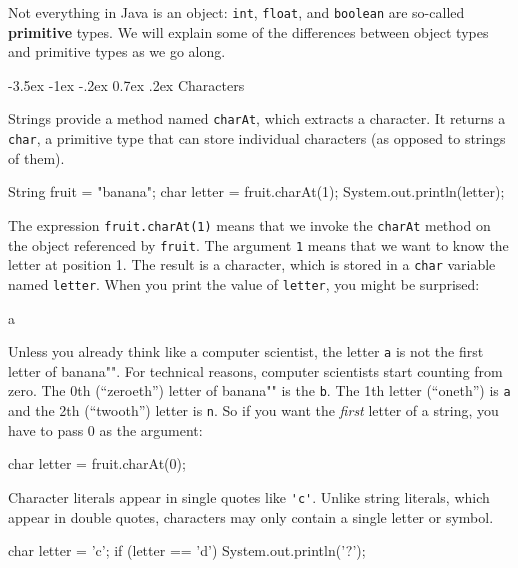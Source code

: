 \documentclass[12pt]{book}
\makeatletter
\theoremstyle{exercise}
\newcommand{\java}[1]{\verb"#1"}
\renewcommand{\section}{\@startsection{section}{1}{\z@}%
    {-3.5ex \@plus -1ex \@minus -.2ex}%
    {0.7ex \@plus.2ex}%
    {\normalfont\Large\bfseries}}
\newcommand{\java}[1]{\lstinline{#1}} %
\makeatother
\begin{document}
Not everything in Java is an object: \java{int}, \java{float}, and \java{boolean} are so-called {\bf primitive} types.
We will explain some of the differences between object types and primitive types as we go along.


\section{Characters}


Strings provide a method named \java{charAt}, which extracts a character.
It returns a \java{char}, a primitive type that can store individual characters (as opposed to strings of them).

\begin{code}
    String fruit = "banana";
    char letter = fruit.charAt(1);
    System.out.println(letter);
\end{code}

The expression \java{fruit.charAt(1)} means that we invoke the \java{charAt} method on the object referenced by \java{fruit}.
The argument \java{1} means that we want to know the letter at position 1.
The result is a character, which is stored in a \java{char} variable named \java{letter}.
When you print the value of \java{letter}, you might be surprised:

\begin{stdout}
a
\end{stdout}

Unless you already think like a computer scientist, the letter \java{a} is not the first letter of \java{"banana"}.
For technical reasons, computer scientists start counting from zero.
The 0th (``zeroeth'') letter of \java{"banana"} is the \java{b}.
The 1th letter (``oneth'') is \java{a} and the 2th (``twooth'') letter is \java{n}.
So if you want the {\em first} letter of a string, you have to pass 0 as the argument:

\begin{code}
    char letter = fruit.charAt(0);
\end{code}


Character literals appear in single quotes like \java{'c'}.
Unlike string literals, which appear in double quotes, characters may only contain a single letter or symbol.

\begin{code}
    char letter = 'c';
    if (letter == 'd') {
        System.out.println('?');
    }
\end{code}
\end{document}
